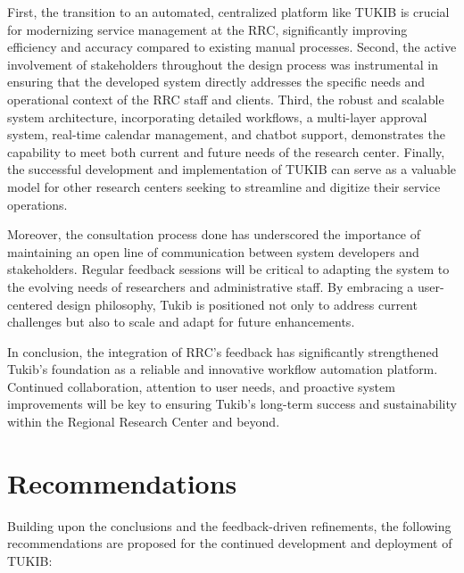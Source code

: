 First, the transition to an automated, centralized platform like TUKIB is crucial for modernizing service management at the RRC, significantly improving efficiency and accuracy compared to existing manual processes. Second, the active involvement of stakeholders throughout the design process was instrumental in ensuring that the developed system directly addresses the specific needs and operational context of the RRC staff and clients. Third, the robust and scalable system architecture, incorporating detailed workflows, a multi-layer approval system, real-time calendar management, and chatbot support, demonstrates the capability to meet both current and future needs of the research center. Finally, the successful development and implementation of TUKIB can serve as a valuable model for other research centers seeking to streamline and digitize their service operations.

Moreover, the consultation process done has underscored the importance of maintaining an open line of communication between system developers and stakeholders. Regular feedback sessions will be critical to adapting the system to the evolving needs of researchers and administrative staff. By embracing a user-centered design philosophy, Tukib is positioned not only to address current challenges but also to scale and adapt for future enhancements.

In conclusion, the integration of RRC’s feedback has significantly strengthened Tukib’s foundation as a reliable and innovative workflow automation platform. Continued collaboration, attention to user needs, and proactive system improvements will be key to ensuring Tukib’s long-term success and sustainability within the Regional Research Center and beyond.

\section{Recommendations}
Building upon the conclusions and the feedback-driven refinements, the following recommendations are proposed for the continued development and deployment of TUKIB:


